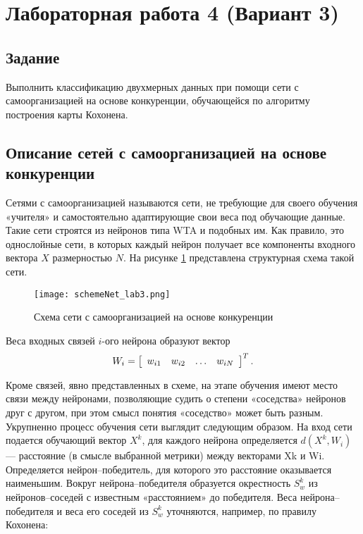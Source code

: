 \section{Лабораторная работа 4 (Вариант 3)}
\subsection{Задание}

Выполнить классификацию двухмерных данных при помощи сети с самоорганизацией на основе конкуренции, обучающейся по алгоритму построения карты Кохонена.

\subsection{Описание сетей с самоорганизацией на основе конкуренции}
Сетями с самоорганизацией называются сети, не требующие для своего
обучения «учителя» и самостоятельно адаптирующие свои веса под обучающие
данные. Такие сети строятся из нейронов типа WTA и подобных
им. Как правило, это однослойные сети, в которых каждый нейрон получает
все компоненты входного вектора $X$ размерностью $N$. На рисунке \ref{img:schemeNet_lab3}
представлена структурная схема такой сети.

\begin{figure}[H]
\centering
\texttt{[image: schemeNet\_lab3.png]}
\caption{Схема сети с самоорганизацией на основе конкуренции}
\label{img:schemeNet_lab3}
\end{figure}

Веса входных связей $i$-ого нейрона образуют вектор
\begin{equation}
    W_{i} = \left[ \begin{array} { l l l l }{w_{i 1}} & {w_{i 2}}&{\dots}&{w_{ i N }}\end{array}\right]^{T} .
\end{equation}

Кроме связей, явно представленных в схеме, на этапе обучения имеют место
связи между нейронами, позволяющие судить о степени «соседства»
нейронов друг с другом, при этом смысл понятия «соседство» может
быть разным.
Укрупненно процесс обучения сети выглядит следующим образом. На
вход сети подается обучающий вектор $X^k$, для каждого нейрона определяется
$d(X^k, W_i)$ — расстояние (в смысле выбранной метрики) между
векторами Xk и Wi. Определяется нейрон–победитель, для которого это
расстояние оказывается наименьшим. Вокруг нейрона–победителя образуется окрестность $S^k_w$ из нейронов–соседей с известным «расстоянием» до победителя. Веса нейрона–победителя и веса его соседей из $S^k_w$ уточняются, например, по правилу Кохонена:


